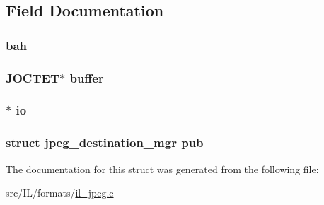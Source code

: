 \subsection{Field Documentation}
\hypertarget{structiwrite__mgr_a7b1db4582e3bb7250a80c42bf0afcf4f}{
\subsubsection[{bah}]{ bah}}\label{structiwrite__mgr_a7b1db4582e3bb7250a80c42bf0afcf4f}
\hypertarget{structiwrite__mgr_ab52519326423db6890165ce4f4d3d818}{
\subsubsection[{buffer}]{\setlength{\rightskip}{0pt plus 5cm}J\-O\-C\-T\-E\-T$\ast$ buffer}}\label{structiwrite__mgr_ab52519326423db6890165ce4f4d3d818}
\hypertarget{structiwrite__mgr_ab6115e5993ca62edfb3a32ef981294c5}{
\subsubsection[{io}]{$\ast$ io}}\label{structiwrite__mgr_ab6115e5993ca62edfb3a32ef981294c5}
\hypertarget{structiwrite__mgr_a755405c3ce0d3ee7efdd305bf2b5995d}{
\subsubsection[{pub}]{\setlength{\rightskip}{0pt plus 5cm}struct jpeg\-\_\-destination\-\_\-mgr pub}}\label{structiwrite__mgr_a755405c3ce0d3ee7efdd305bf2b5995d}


The documentation for this struct was generated from the following file\-:\begin{DoxyCompactItemize}
\item 
src/\-I\-L/formats/\hyperlink{il__jpeg_8c}{il\-\_\-jpeg.\-c}\end{DoxyCompactItemize}
